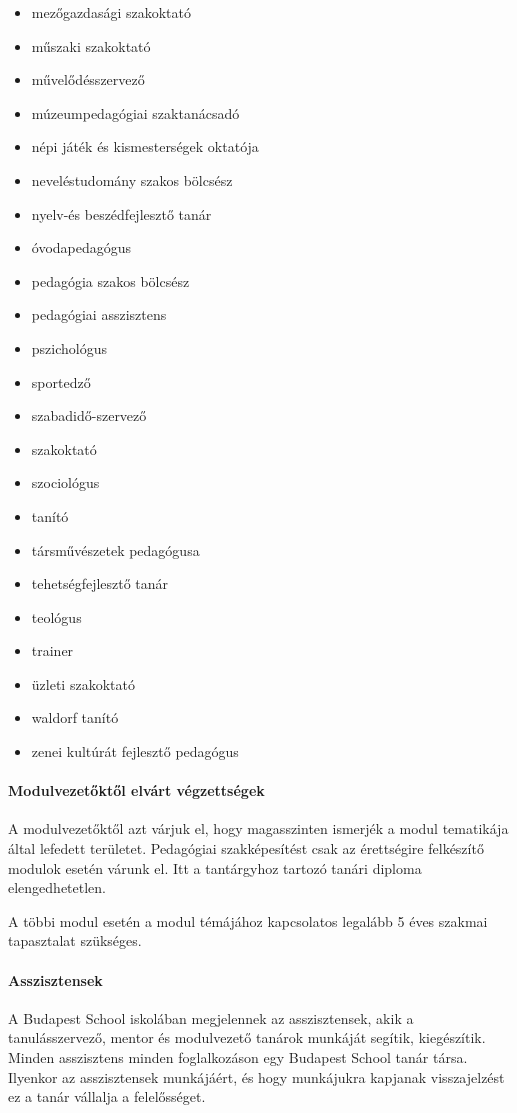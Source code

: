 \begin{itemize}
    \item mezőgazdasági szakoktató
    \item műszaki szakoktató
    \item művelődésszervező
    \item múzeumpedagógiai szaktanácsadó
    \item népi játék és kismesterségek oktatója
    \item neveléstudomány szakos bölcsész
    \item nyelv-és beszédfejlesztő tanár
    \item óvodapedagógus
    \item pedagógia szakos bölcsész
    \item pedagógiai asszisztens
    \item pszichológus
    \item sportedző
    \item szabadidő-szervező
    \item szakoktató
    \item szociológus
    \item tanító
    \item társművészetek pedagógusa
    \item tehetségfejlesztő tanár
    \item teológus
    \item trainer
    \item üzleti szakoktató
    \item waldorf tanító
    \item zenei kultúrát fejlesztő pedagógus
\end{itemize}

\paragraph{Modulvezetőktől elvárt végzettségek}
A modulvezetőktől azt várjuk el, hogy magasszinten ismerjék a modul tematikája
által lefedett területet. Pedagógiai szakképesítést csak az érettségire
felkészítő modulok esetén várunk el. Itt a tantárgyhoz tartozó tanári diploma
elengedhetetlen.

A többi modul esetén a modul témájához kapcsolatos legalább 5 éves szakmai
tapasztalat szükséges.

\paragraph{Asszisztensek}
A Budapest School iskolában megjelennek az asszisztensek, akik a
tanulásszervező, mentor és modulvezető tanárok munkáját segítik, kiegészítik.
Minden asszisztens minden foglalkozáson egy Budapest School tanár társa.
Ilyenkor az asszisztensek munkájáért, és hogy munkájukra kapjanak visszajelzést
ez a tanár vállalja a felelősséget.

